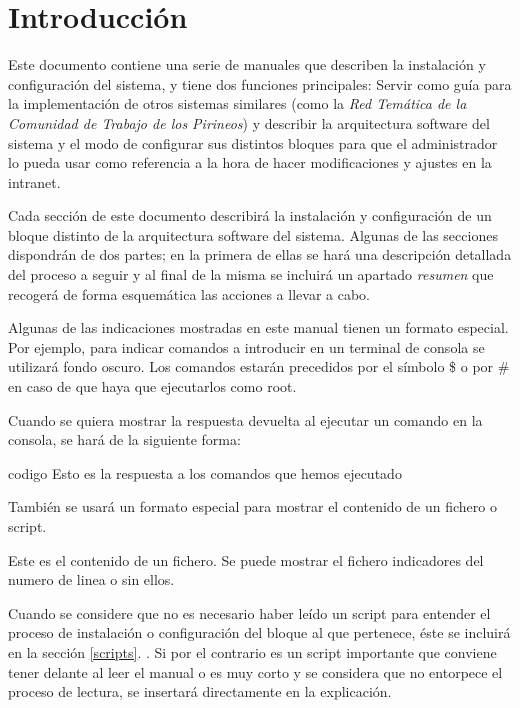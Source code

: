 \section{Introducción}
\label{introduccion}

Este documento contiene una serie de manuales que describen la instalación y configuración del sistema, y tiene dos funciones principales: Servir como guía para la implementación de otros sistemas similares (como la \emph{Red Temática de la Comunidad de Trabajo de los Pirineos}) y describir la arquitectura software del sistema y el modo de configurar sus distintos bloques para que el administrador lo pueda usar como referencia a la hora de hacer modificaciones y ajustes en la intranet.

Cada sección de este documento describirá la instalación y configuración de un bloque distinto de la arquitectura software del sistema. Algunas de las secciones dispondrán de dos partes; en la primera de ellas se hará una descripción detallada del proceso a seguir y al final de la misma se incluirá un apartado \emph{resumen} que recogerá de forma esquemática las acciones a llevar a cabo.

Algunas de las indicaciones mostradas en este manual tienen un formato especial. Por ejemplo, para indicar comandos a introducir en un terminal de consola se utilizará fondo oscuro. Los comandos estarán precedidos por el símbolo \$ o por \# en caso de que haya que ejecutarlos como root.


Cuando se quiera mostrar la respuesta devuelta al ejecutar un comando en la consola, se hará de la siguiente forma:

\begin{SaveVerbatim}{codigo}
Esto es la respuesta a los comandos que hemos ejecutado
\end{SaveVerbatim}

También se usará un formato especial para mostrar el contenido de un fichero o script.
\begin{listing}
Este es el contenido de un fichero.
Se puede mostrar el fichero indicadores del numero de linea o sin ellos.
\end{listing}

Cuando se considere que no es necesario haber leído un script para entender el proceso de instalación o configuración del bloque al que pertenece, éste se incluirá en la sección \ref{scripts}. . Si por el contrario es un script importante que conviene tener delante al leer el manual o es muy corto y se considera que no entorpece el proceso de lectura, se insertará directamente en la explicación.